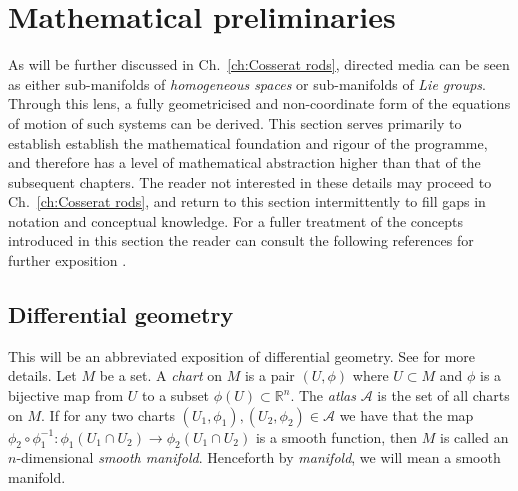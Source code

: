 



\section{Mathematical preliminaries}

As will be further discussed in Ch.~\ref{ch:Cosserat rods}, directed media can be seen as either sub-manifolds of \textit{homogeneous spaces} or sub-manifolds of \textit{Lie groups}. Through this lens, a fully geometricised and non-coordinate form of the equations of motion of such systems can be derived. This section serves primarily to establish establish the mathematical foundation and rigour of the programme, and therefore has a level of mathematical abstraction higher than that of the subsequent chapters. The reader not interested in these details may proceed to Ch.~\ref{ch:Cosserat rods}, and return to this section intermittently to fill gaps in notation and conceptual knowledge. For a fuller treatment of the concepts introduced in this section the reader can consult the following references for further exposition \citep{clellandFrenetCartanMethod2017, kleinDevelopmentMathematics19th1979, marsdenIntroductionMechanicsSymmetry2013, marleHenriPoincareNote2013a}.

\subsection{Differential geometry}

This will be an abbreviated exposition of differential geometry. See \citep{misnerGravitation2017} for more details. Let $M$ be a set. A \textit{chart} on $M$ is a pair $(U, \phi)$ where $U \subset M$ and $\phi$ is a bijective map from $U$ to a subset $\phi(U) \subset \mathbb{R}^n$. The \textit{atlas} $\mathcal{A}$ is the set of all charts on $M$. If for any two charts $(U_1, \phi_1), (U_2, \phi_2) \in \mathcal{A}$ we have that the map $\phi_2 \circ \phi_1^{-1} : \phi_1( U_1 \cap U_2) \to \phi_2( U_1 \cap U_2)$ is a smooth function, then $M$ is called an $n$-dimensional \textit{smooth manifold}. Henceforth by \textit{manifold}, we will mean a smooth manifold.

